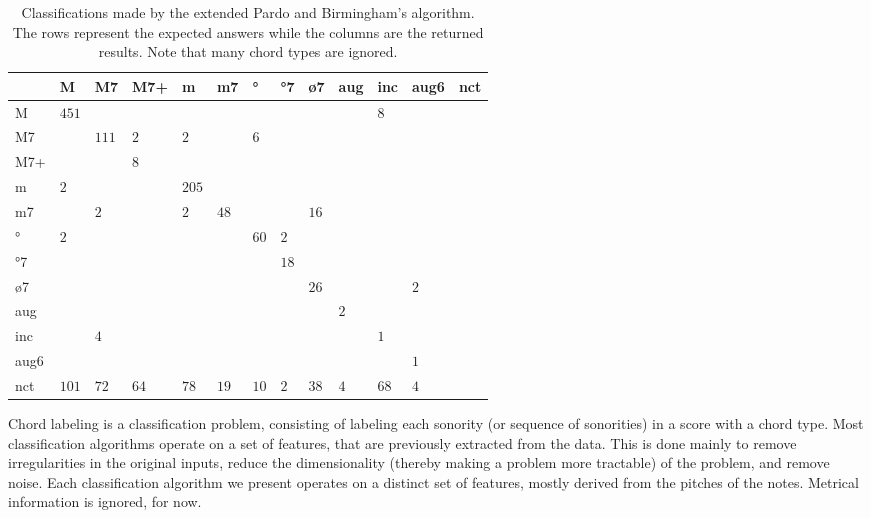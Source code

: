 \documentclass{article}
\begin{document}
\begin{table*}
\centering
\begin{tabular}{l|p{0.55cm}|p{0.55cm}|p{0.55cm}|p{0.55cm}|p{0.55cm}|p{0.55cm}|p{0.55cm}|p{0.55cm}|p{0.55cm}|p{0.55cm}|p{0.55cm}|p{0.55cm}}
      &     M &    M7 &   M7+ &     m &    m7 &    ° &   °7 &   ø7 &   aug &   inc &  aug6 &   nct  \\  \hline
    M & $ 451 $& $ $& $ $& $ $& $ $& $ $& $ $& $ $& $ $& $   8 $& $ $& $ $ \\ \hline
   M7 & $ $& $ 111 $& $   2 $& $   2 $& $ $& $   6 $& $ $& $ $& $ $& $ $& $ $& $ $ \\ \hline
  M7+ & $ $& $ $& $   8 $& $ $& $ $& $ $& $ $& $ $& $ $& $ $& $ $& $ $ \\ \hline
    m & $   2 $& $ $& $ $& $ 205 $& $ $& $ $& $ $& $ $& $ $& $ $& $ $& $ $ \\ \hline
   m7 & $ $& $   2 $& $ $& $   2 $& $  48 $& $ $& $ $& $  16 $& $ $& $ $& $ $& $ $ \\ \hline
   ° & $   2 $& $ $& $ $& $ $& $ $& $  60 $& $   2 $& $ $& $ $& $ $& $ $& $ $ \\ \hline
  °7 & $ $& $ $& $ $& $ $& $ $& $ $& $  18 $& $ $& $ $& $ $& $ $& $ $ \\ \hline
  ø7 & $ $& $ $& $ $& $ $& $ $& $ $& $ $& $  26 $& $ $& $ $& $   2 $& $ $ \\ \hline
  aug & $ $& $ $& $ $& $ $& $ $& $ $& $ $& $ $& $   2 $& $ $& $ $& $ $ \\ \hline
  inc & $ $& $   4 $& $ $& $ $& $ $& $ $& $ $& $ $& $ $& $   1 $& $ $& $ $ \\ \hline
 aug6 & $ $& $ $& $ $& $ $& $ $& $ $& $ $& $ $& $ $& $ $& $   1 $& $ $ \\ \hline
  nct & $ 101 $& $  72 $& $  64 $& $  78 $& $  19 $& $  10 $& $   2 $& $  38 $& $   4 $& $  68 $& $   4 $& $ $ \\ \hline
\end{tabular}


\caption{Classifications made by the extended Pardo and Birmingham's algorithm. The rows represent
  the expected answers while the columns are the returned
  results. Note that many chord types are ignored.}
\label{tab:erros-es-pb}
\end{table*}

Chord labeling is a classification problem, consisting of labeling
each sonority (or sequence of sonorities) in a score with a chord
type. Most classification algorithms operate on a set of features,
that are previously extracted from the data. This is done mainly to
remove irregularities in the original inputs, reduce the
dimensionality (thereby making a problem more tractable) of the
problem, and remove noise. Each classification algorithm we present
operates on a distinct set of features, mostly derived from the
pitches of the notes. Metrical information is ignored, for now.
\end{document}
